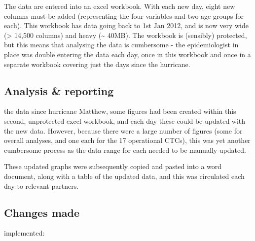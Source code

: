 \documentclass[]{tufte-handout}
\begin{document}
The data are entered into an excel workbook. With each new day, eight
new columns must be added (representing the four variables and two age
groups for each). This workbook has data going back to 1st Jan 2012, and
is now very wide (\textgreater{} 14,500 columns) and heavy
(\textasciitilde{} 40MB). The workbook is (sensibly) protected, but this
means that analysing the data is cumbersome - the epidemiologist in
place was double entering the data each day, once in this workbook and
once in a separate workbook covering just the days since the hurricane.

\subsection{Analysis \& reporting}\label{analysis-reporting}

 the data since hurricane Matthew, some
figures had been created within this second, unprotected excel workbook,
and each day these could be updated with the new data. However, because
there were a large number of figures (some for overall analyses, and one
each for the 17 operational CTCs), this was yet another cumbersome
process as the data range for each needed to be manually updated.

These updated graphs were subsequently copied and pasted into a word
document, along with a table of the updated data, and this was
circulated each day to relevant partners.

\subsection{Changes made}\label{changes-made}

 implemented:
\end{document}
